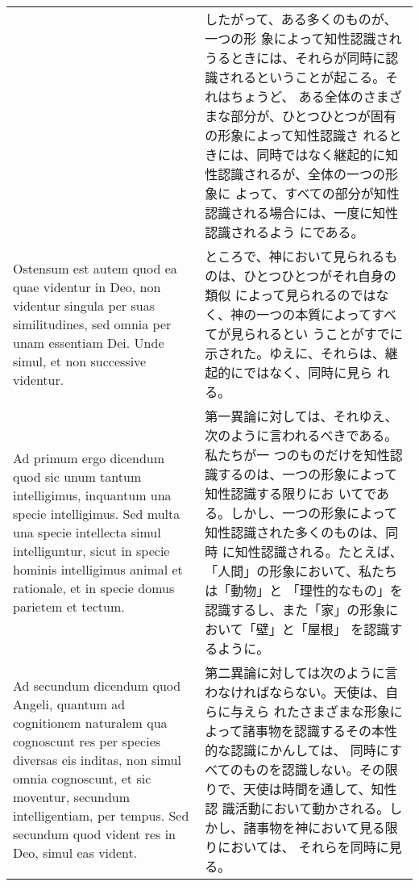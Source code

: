 \documentclass[10pt]{jsarticle} %
\begin{document}
\begin{longtable}{p{21em}p{21em}}
&

したがって、ある多くのものが、一つの形
象によって知性認識されうるときには、それらが同時に認識されるということが起こる。それはちょうど、
ある全体のさまざまな部分が、ひとつひとつが固有の形象によって知性認識さ
れるときには、同時ではなく継起的に知性認識されるが、全体の一つの形象に
よって、すべての部分が知性認識される場合には、一度に知性認識されるよう
にである。

\\

Ostensum est autem quod ea quae videntur in Deo, non
videntur singula per suas similitudines, sed omnia per unam essentiam
Dei. Unde simul, et non successive videntur.

&

ところで、神において見られるものは、ひとつひとつがそれ自身の類似
によって見られるのではなく、神の一つの本質によってすべてが見られるとい
うことがすでに示された。ゆえに、それらは、継起的にではなく、同時に見ら
れる。

\\

{\sc Ad primum ergo dicendum} quod sic unum tantum intelligimus,
inquantum una specie intelligimus. Sed multa una specie intellecta
simul intelliguntur, sicut in specie hominis intelligimus animal et
rationale, et in specie domus parietem et tectum.

&

第一異論に対しては、それゆえ、次のように言われるべきである。私たちが一
つのものだけを知性認識するのは、一つの形象によって知性認識する限りにお
いてである。しかし、一つの形象によって知性認識された多くのものは、同時
に知性認識される。たとえば、「人間」の形象において、私たちは「動物」と
「理性的なもの」を認識するし、また「家」の形象において「壁」と「屋根」
を認識するように。

\\

{\sc Ad secundum dicendum} quod Angeli, quantum ad cognitionem
naturalem qua cognoscunt res per species diversas eis inditas, non
simul omnia cognoscunt, et sic moventur, secundum intelligentiam, per
tempus. Sed secundum quod vident res in Deo, simul eas vident.

&

第二異論に対しては次のように言わなければならない。天使は、自らに与えら
れたさまざまな形象によって諸事物を認識するその本性的な認識にかんしては、
同時にすべてのものを認識しない。その限りで、天使は時間を通して、知性認
識活動において動かされる。しかし、諸事物を神において見る限りにおいては、
それらを同時に見る。

\end{longtable}
\end{document}
